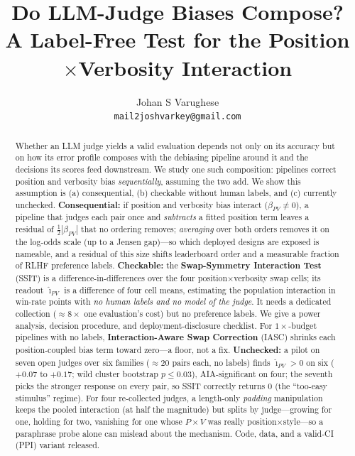 \documentclass{article}
\begin{document}
\sloppy

\title{Do LLM-Judge Biases Compose?\\
A Label-Free Test for the Position$\times$Verbosity Interaction}

\author{%
  Johan S Varughese\\
  \texttt{mail2joshvarkey@gmail.com}%
}

\maketitle

\begin{abstract}
Whether an LLM judge yields a valid evaluation depends not only on
its accuracy but on how its error profile composes with the
debiasing pipeline around it and the decisions its scores feed
downstream. We study one such composition: pipelines
correct position and verbosity bias \emph{sequentially}, assuming
the two add. We show this assumption is (a) consequential, (b)
checkable without human labels, and (c) currently unchecked.
\textbf{Consequential:} if position and verbosity bias interact
($\beta_{PV}\neq0$), a pipeline that judges each pair once and
\emph{subtracts} a fitted position term leaves a residual of
$\tfrac12|\beta_{PV}|$ that no ordering removes; \emph{averaging}
over both orders removes it on the log-odds scale (up to a Jensen
gap)---so which deployed designs are exposed is nameable, and a
residual of this size shifts leaderboard order and a measurable
fraction of RLHF preference labels. \textbf{Checkable:} the
\textbf{Swap-Symmetry Interaction Test} (SSIT) is a
difference-in-differences over the four position$\times$verbosity
swap cells; its readout $\hat\imath_{PV}$ is a difference of four
cell means, estimating the population interaction in win-rate points
with \emph{no human labels and no model of the judge}. It needs a
dedicated collection (${\approx}8\times$ one evaluation's cost) but
no preference labels. We give a power analysis, decision procedure,
and deployment-disclosure checklist. For $1\times$-budget
pipelines with no labels, \textbf{Interaction-Aware Swap Correction}
(IASC) shrinks each position-coupled bias term toward zero---a
floor, not a fix. \textbf{Unchecked:} a pilot on seven open judges
over six families ($\approx$20 pairs each, no labels) finds
$\hat\imath_{PV}>0$ on six ($+0.07$ to $+0.17$; wild cluster
bootstrap $p\!\leq\!0.03$), AIA-significant on four; the seventh
picks the stronger response on every pair, so SSIT correctly returns
$0$ (the ``too-easy stimulus'' regime). For four re-collected
judges, a length-only \emph{padding} manipulation keeps the pooled
interaction (at half the magnitude) but splits by judge---growing
for one, holding for two, vanishing for one whose $P{\times}V$ was
really position$\times$style---so a paraphrase probe alone can
mislead about the mechanism. Code, data, and a valid-CI (PPI)
variant released.
\end{abstract}
\end{document}
